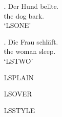 
\renewcommand\lpzglisttitle[1]{\par\noindent LSTITLEMARK #1\par}
\renewcommand\lpzglistentry[2]{LSENTRY #1=#2;}

\ex. \gll Der Hund bellte.\\ the dog bark.\\
\glt `LSONE'

\ex. \gll Die Frau schl\"aft.\\ the woman sleep.\\
\glt `LSTWO'

LSPLAIN \lpzglist

LSOVER \lpzglist[title={LSOVERTITLE}]

LSSTYLE \lpzglist[style=list, title={LSSTYLETITLE},
                  format={\item[\textsc{#1}] LSFMT #2}]

